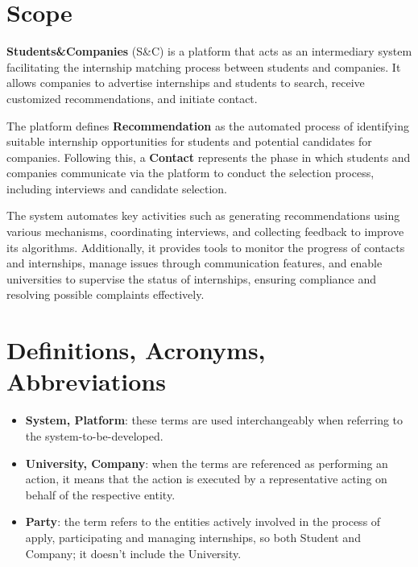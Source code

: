 \section{Scope}
\label{sec:scope}%
\textbf{Students\&Companies} (S\&C) is a platform that acts as an intermediary system facilitating the internship matching process between students and companies. It allows companies to advertise internships and students to search, receive customized recommendations, and initiate contact.

The platform defines \textbf{Recommendation} as the automated process of identifying suitable internship opportunities for students and potential candidates for companies. Following this, a \textbf{Contact} represents the phase in which students and companies communicate via the platform to conduct the selection process, including interviews and candidate selection.

The system automates key activities such as generating recommendations using various mechanisms, coordinating interviews, and collecting feedback to improve its algorithms. Additionally, it provides tools to monitor the progress of contacts and internships, manage issues through communication features, and enable universities to supervise the status of internships, ensuring compliance and resolving possible complaints effectively.

\section{Definitions, Acronyms, Abbreviations}
\label{sec:definition_acronyms_abbreviations}

\begin{itemize}

\item \textbf{System, Platform}: these terms are used interchangeably when referring to the system-to-be-developed.

\item \textbf{University, Company}: when the terms are referenced as performing an action, it means that the action is executed by a representative acting on behalf of the respective entity.

\item \textbf{Party}: the term refers to the entities actively involved in the process of apply, participating and managing internships, so both Student and Company; it doesn't include the University.

\end{itemize}

